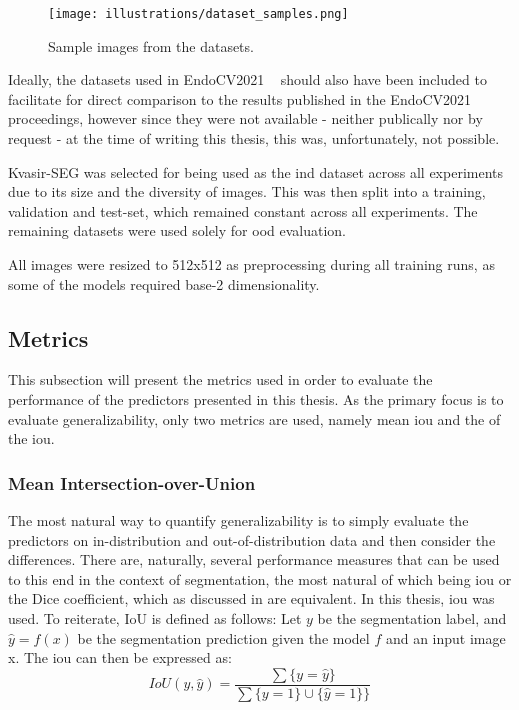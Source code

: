     \begin{figure}[htb]
        \centering
        \texttt{[image: illustrations/dataset\_samples.png]}
        \caption{Sample images from the datasets.}
        \label{fig:dataset_examples}
    \end{figure}
    
    Ideally, the datasets used in EndoCV2021 ~\cite{endocv2021} should also have been included to facilitate for direct comparison to the results published in the EndoCV2021 proceedings, however since they were not available - neither publically nor by request - at the time of writing this thesis, this was, unfortunately, not possible. 
    
    Kvasir-SEG was selected for being used as the \gls{ind} dataset across all experiments due to its size and the diversity of images. This was then split into a training, validation and test-set, which remained constant across all experiments. The remaining datasets were used solely for \gls{ood} evaluation.
    
    All images were resized to 512x512 as preprocessing during all training runs, as some of the models required base-2 dimensionality.
    
\subsection{Metrics} \label{metrics}
    This subsection will present the metrics used in order to evaluate the performance of the predictors presented in this thesis. As the primary focus is to evaluate generalizability, only two metrics are used, namely mean \gls{iou} and the  of the \gls{iou}.

    \subsubsection{Mean Intersection-over-Union}
    
    The most natural way to quantify generalizability is to simply evaluate the predictors on in-distribution and out-of-distribution data and then consider the differences. There are, naturally, several performance measures that can be used to this end in the context of segmentation, the most natural of which being \gls{iou} or the Dice coefficient, which as discussed in  are equivalent. In this thesis, \gls{iou} was used. To reiterate, IoU is defined as follows:
    Let \(y\) be the segmentation label, and \(\hat{y}=f(x)\) be the segmentation prediction given the model \(f\) and an input image x. The \gls{iou} can then be expressed as: 
    \begin{equation*}
        IoU(y, \hat{y}) = \frac{\sum \{y=\hat{y}\} }{\sum \{y=1\} \cup \{\hat{y}=1\}\}}
    \end{equation*}
    
